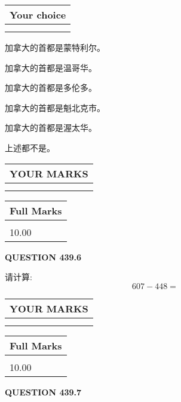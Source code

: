 \documentclass{ctexart}
\begin{document}
  
\noindent\hspace{3.0in} \begin{tabular}{|l|}
\hline
Your choice \\
\hline
 \\ 
 \\ 
\hline
\end{tabular}
  
  
 
 
加拿大的首都是蒙特利尔。
 
 
加拿大的首都是温哥华。
 
 
加拿大的首都是多伦多。
 
 
加拿大的首都是魁北克市。
 
 
加拿大的首都是渥太华。
 
 
 上述都不是。
 
 
  
\vspace{0.2in}
  
\noindent\begin{tabular}{|l|}
\hline
 YOUR MARKS  \\
\hline
 \\ 
 \\ 
\hline
\end{tabular}
\hspace{0.05in} \begin{tabular}{|l|}
\hline
 Full Marks  \\
\hline
 \\ 
10.00 \\
\hline
\end{tabular}
{\textbf{\Large{QUESTION
439.6 
}}}
  
  
 
请计算:
\begin{equation}
607 -   %
448 = \nonumber
\end{equation}
 

 

 
  
\vspace{0.2in}
  
\noindent\begin{tabular}{|l|}
\hline
 YOUR MARKS  \\
\hline
 \\ 
 \\ 
\hline
\end{tabular}
\hspace{0.05in} \begin{tabular}{|l|}
\hline
 Full Marks  \\
\hline
 \\ 
10.00 \\
\hline
\end{tabular}
{\textbf{\Large{QUESTION
439.7 
}}}
  
\end{document}

